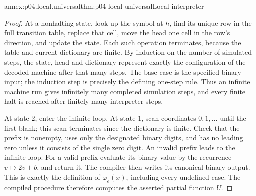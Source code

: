 \begin{annexitem}{annex:p04.local.universal}{thm:p04-local-universal}{Local interpreter}
\begin{proof}
At a nonhalting state, look up the symbol at \(h\), find its unique row
in the full transition table, replace that cell, move the head one cell
in the row's direction, and update the state.  Each such operation
terminates, because the table and current dictionary are finite.  By
induction on the number of simulated steps, the state, head and dictionary
represent exactly the configuration of the decoded machine after that
many steps.  The base case is the specified binary input; the induction
step is precisely the defining one-step rule.  Thus an infinite machine
run gives infinitely many completed simulation steps, and every finite
halt is reached after finitely many interpreter steps.

At state \(2\), enter the infinite loop.  At state \(1\), scan coordinates
\(0,1,\ldots\) until the first blank; this scan terminates since the
dictionary is finite.  Check that the prefix is nonempty, uses only the
designated binary digits, and has no leading zero unless it consists of
the single zero digit.  An invalid prefix leads to the infinite loop.
For a valid prefix evaluate its binary value by the recurrence
\(v\mapsto2v+b\), and return it.  The compiler then writes its canonical
binary output.  This is exactly the definition of \(\varphi_e(x)\),
including every undefined case.  The compiled procedure therefore
computes the asserted partial function \(U\).
\end{proof}
\end{annexitem}

